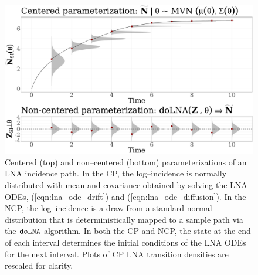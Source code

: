 \begin{figure}[htbp]
	\centering
	\includegraphics[width=\textwidth]{figures/lna_sampling_diagram}
	\caption[Diagram of centered and non--centered parameterizations of an LNA path.]{Centered (top) and non--centered (bottom) parameterizations of an LNA incidence path. In the CP, the log--incidence is normally distributed with mean and covariance obtained by solving the LNA ODEs, (\ref{eqn:lna_ode_drift}) and (\ref{eqn:lna_ode_diffusion}). In the NCP, the log--incidence is a draw from a standard normal distribution that is deterministically mapped to a sample path via the $ \texttt{doLNA} $ algorithm. In both the CP and NCP, the state at the end of each interval determines the initial conditions of the LNA ODEs for the next interval. Plots of CP LNA transition densities are rescaled for clarity.}
	\label{fig:lna_sampling_diagram}
\end{figure}

